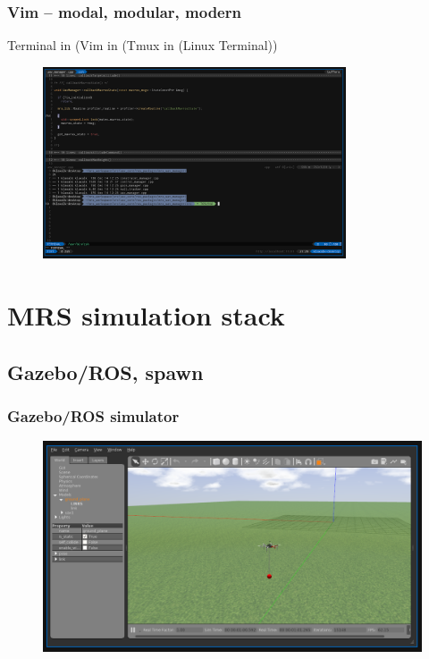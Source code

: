 \documentclass[aspectratio=1610]{beamer}
\begin{document}


\begin{frame}
  \frametitle{Vim -- modal, modular, modern}

  \begin{block}{Terminal in (Vim in (Tmux in (Linux Terminal))}
    \begin{figure}
      \includegraphics[width=0.8\textwidth]{./fig/terminal_in_vim.png}
    \end{figure}
  \end{block}

\end{frame}



\section{MRS simulation stack}

\subsection{Gazebo/ROS, spawn}

\begin{frame}
  \frametitle{Gazebo/ROS simulator}

  \begin{figure}
    \includegraphics[width=1.0\textwidth]{./fig/gazebo.png}
  \end{figure}

\end{frame}
\end{document}

